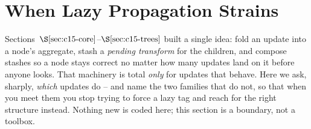 \section{When Lazy Propagation Strains}\label{sec:c15-strains}

\begin{previouslybox}
Sections~\(\secref{c15-core}\)--\(\secref{c15-trees}\) built a single idea: fold an update into a node's aggregate, stash a \emph{pending transform} for the children, and compose stashes so a node stays correct no matter how many updates land on it before anyone looks.  That machinery is total \emph{only} for updates that behave.  Here we ask, sharply, \emph{which} updates do -- and name the two families that do not, so that when you meet them you stop trying to force a lazy tag and reach for the right structure instead.  Nothing new is coded here; this section is a boundary, not a toolbox.
\end{previouslybox}

